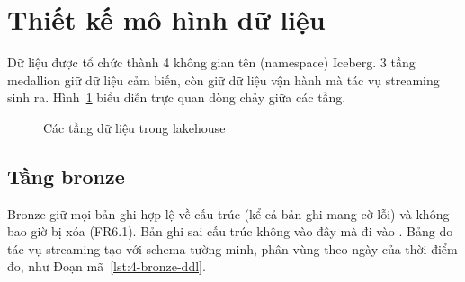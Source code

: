 \section{Thiết kế mô hình dữ liệu}
\label{sec:4-data-model}

Dữ liệu được tổ chức thành 4 không gian tên (namespace) Iceberg. 3 tầng medallion giữ dữ liệu cảm biến, còn  giữ dữ liệu vận hành mà tác vụ streaming sinh ra. Hình~\ref{fig:4-medallion} biểu diễn trực quan dòng chảy giữa các tầng.

\begin{figure}[H]
\centering
{}
\caption{Các tầng dữ liệu trong lakehouse}
\label{fig:4-medallion}
\end{figure}

\subsection{Tầng bronze}
\label{sec:4-bronze}

Bronze giữ mọi bản ghi hợp lệ về cấu trúc (kể cả bản ghi mang cờ lỗi) và không bao giờ bị xóa (FR6.1). Bản ghi sai cấu trúc không vào đây mà đi vào . Bảng do tác vụ streaming tạo với schema tường minh, phân vùng theo ngày của thời điểm đo, như Đoạn mã~\ref{lst:4-bronze-ddl}.

